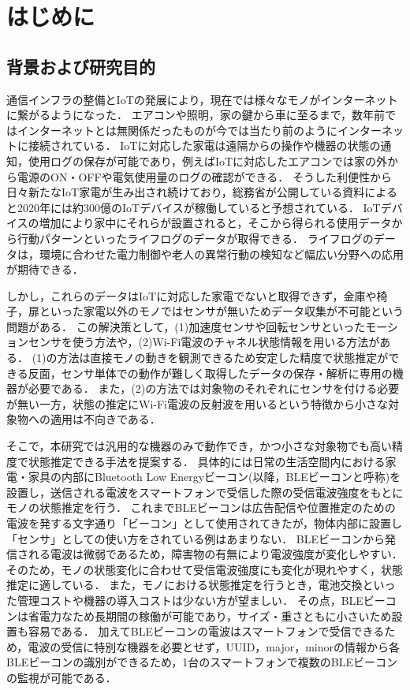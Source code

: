 \chapter{はじめに}
\thispagestyle{myheadings}

\section{背景および研究目的}

通信インフラの整備とIoTの発展により，現在では様々なモノがインターネットに繋がるようになった．
エアコンや照明，家の鍵から車に至るまで，数年前ではインターネットとは無関係だったものが今では当たり前のようにインターネットに接続されている．
IoTに対応した家電は遠隔からの操作や機器の状態の通知，使用ログの保存が可能であり，例えばIoTに対応したエアコンでは家の外から電源のON・OFFや電気使用量のログの確認ができる．
そうした利便性から日々新たなIoT家電が生み出され続けており，総務省が公開している資料\cite{soumusyo}によると2020年には約300億のIoTデバイスが稼働していると予想されている．
IoTデバイスの増加により家中にそれらが設置されると，そこから得られる使用データから行動パターンといったライフログのデータが取得できる．
ライフログのデータは，環境に合わせた電力制御や老人の異常行動の検知など幅広い分野への応用が期待できる．

しかし，これらのデータはIoTに対応した家電でないと取得できず，金庫や椅子，扉といった家電以外のモノではセンサが無いためデータ収集が不可能という問題がある．
この解決策として，(1)加速度センサや回転センサといったモーションセンサを使う方法や，(2)Wi-Fi電波のチャネル状態情報を用いる方法がある．
(1)の方法は直接モノの動きを観測できるため安定した精度で状態推定ができる反面，センサ単体での動作が難しく取得したデータの保存・解析に専用の機器が必要である．
また，(2)の方法では対象物のそれぞれにセンサを付ける必要が無い一方，状態の推定にWi-Fi電波の反射波を用いるという特徴から小さな対象物への適用は不向きである．

そこで，本研究では汎用的な機器のみで動作でき，かつ小さな対象物でも高い精度で状態推定できる手法を提案する．
具体的には日常の生活空間内における家電・家具の内部にBluetooth Low Energyビーコン(以降，BLEビーコンと呼称)を設置し，送信される電波をスマートフォンで受信した際の受信電波強度をもとにモノの状態推定を行う．
これまでBLEビーコンは広告配信や位置推定のための電波を発する文字通り「ビーコン」として使用されてきたが，物体内部に設置し「センサ」としての使い方をされている例はあまりない．
BLEビーコンから発信される電波は微弱であるため，障害物の有無により電波強度が変化しやすい．
そのため，モノの状態変化に合わせて受信電波強度にも変化が現れやすく，状態推定に適している．
また，モノにおける状態推定を行うとき，電池交換といった管理コストや機器の導入コストは少ない方が望ましい．
その点，BLEビーコンは省電力なため長期間の稼働が可能であり，サイズ・重さともに小さいため設置も容易である．
加えてBLEビーコンの電波はスマートフォンで受信できるため，電波の受信に特別な機器を必要とせず，UUID，major，minorの情報から各BLEビーコンの識別ができるため，1台のスマートフォンで複数のBLEビーコンの監視が可能である．

